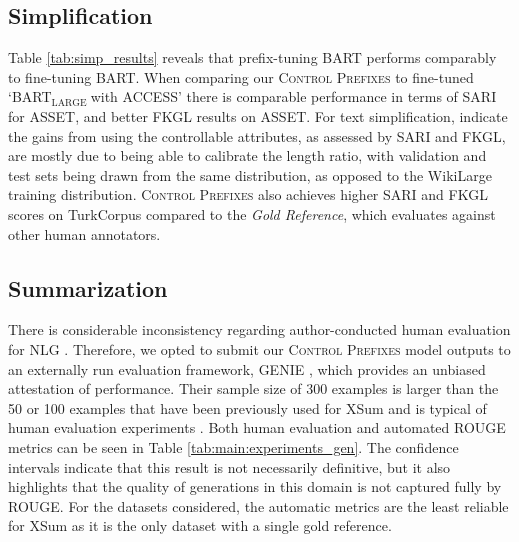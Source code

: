 \documentclass[11pt]{article}
\newcommand{\control}{\textsc{Control Prefixes}\xspace}
\newcommand{\bartl}{BART$_{\text {LARGE }}$}
\begin{document}
\begin{table*}[ht]
{\begin{tabular}{llccccccccc}
        \bottomrule
    \end{tabular}
    }
    \caption{Summarization results on XSum. The human-assessed results are from the GENIE benchmark, where the 95\% confidence intervals are computed with bootstrap re-sampling. Note the \bartl and PEGASUS fine-tuned results for the human-assessed dimensions are transcribed from \citet{GENIE}, whilst the automatic metric results, indicated by $^{*}$, are from \citet{bart} and \citet{peg}. Prefix-tuning and \control ($A_{1}$,$A_{2}$) use \bartl as the fixed LM. $A_{1}$ refers to the BBC news/sport page attribute and $A_{2}$ the further sub-directory attribute. We bold the best results of parameter-efficient models in the results tables for ROUGE, with fully fine-tuned models as reference. The public GENIE leaderboard is available at \url{https://leaderboard.allenai.org/genie-xsum/}.}
    \label{tab:main:experiments_gen}
    
\end{table*}

\subsection{Simplification}

Table \ref{tab:simp_results} reveals that prefix-tuning BART performs comparably to fine-tuning BART. When comparing our \control to fine-tuned ‘\bartl with ACCESS’ there is comparable performance in terms of SARI for ASSET, and better FKGL results on ASSET. For text simplification, \citet{MUSS} indicate the gains from using the controllable attributes, as assessed by SARI and FKGL, are mostly due to being able to calibrate the length ratio, with validation and test sets being drawn from the same distribution, as opposed to the WikiLarge training distribution. 
\control also achieves higher SARI and FKGL scores on TurkCorpus compared to the \emph{Gold Reference}, which evaluates against other human annotators.

\subsection{Summarization}

There is considerable inconsistency regarding author-conducted human evaluation for NLG \citep{vanderlee}. Therefore, we opted to submit our \control model outputs to an externally run evaluation framework, GENIE \citep{GENIE}, which provides an unbiased attestation of performance. Their sample size of 300 examples is larger than the 50 or 100 examples that have been previously used for XSum and is typical of human evaluation experiments \citep{xsum,dou_gsum_2021}.
Both human evaluation and automated ROUGE metrics can be seen in Table \ref{tab:main:experiments_gen}.
The confidence intervals indicate that this result is not necessarily definitive, but it also highlights that the quality of generations in this domain is not captured fully by ROUGE. For the datasets considered, the automatic metrics are the least reliable for XSum as it is the only dataset with a single gold reference. 
\end{document}
